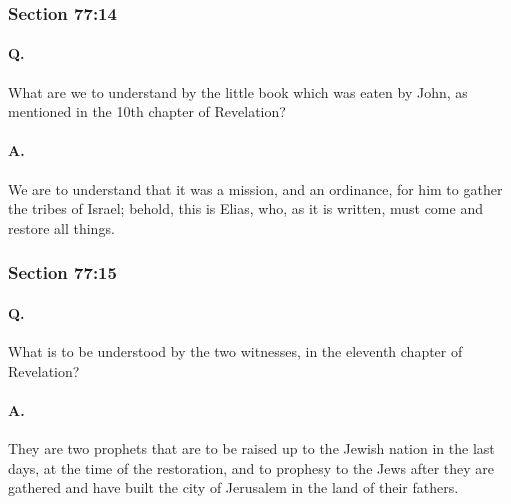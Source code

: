 	\subsubsection{Section 77:14} %
		\label{DC77-14}

		\paragraph{Q.}

			What are we to understand by the little book which was eaten by John, as mentioned in the 10th chapter of Revelation?

		\paragraph{A.}
		
			We are to understand that it was a mission, and an ordinance, for him to gather the tribes of Israel; behold, this is Elias, who, as it is written, must come and restore all things.


	\subsubsection{Section 77:15} %
		\label{DC77-15}

		\paragraph{Q.}
		
			What is to be understood by the two witnesses, in the eleventh chapter of Revelation?

		\paragraph{A.}
		
			They are two prophets that are to be raised up to the Jewish nation in the last days, at the time of the restoration, and to prophesy to the Jews after they are gathered and have built the city of Jerusalem in the land of their fathers.

